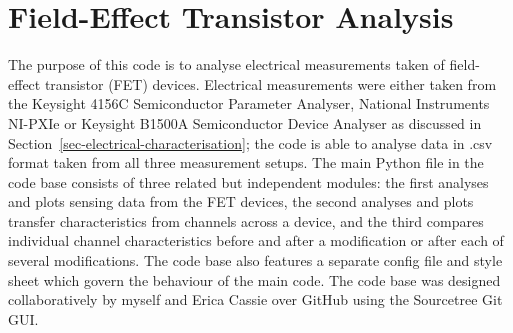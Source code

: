 \documentclass[
  a4paper,
]{scrbook}
\begin{document}
\hypertarget{sec-field-effect-transistor-analysis}{%
\section{Field-Effect Transistor
Analysis}\label{sec-field-effect-transistor-analysis}}

The purpose of this code is to analyse electrical measurements taken of
field-effect transistor (FET) devices. Electrical measurements were
either taken from the Keysight 4156C Semiconductor Parameter Analyser,
National Instruments NI-PXIe or Keysight B1500A Semiconductor Device
Analyser as discussed in Section~\ref{sec-electrical-characterisation};
the code is able to analyse data in .csv format taken from all three
measurement setups. The main Python file in the code base consists of
three related but independent modules: the first analyses and plots
sensing data from the FET devices, the second analyses and plots
transfer characteristics from channels across a device, and the third
compares individual channel characteristics before and after a
modification or after each of several modifications. The code base also
features a separate config file and style sheet which govern the
behaviour of the main code. The code base was designed collaboratively
by myself and Erica Cassie over GitHub using the Sourcetree Git GUI.


\backmatter
\printbibliography[title=References]
\end{document}
